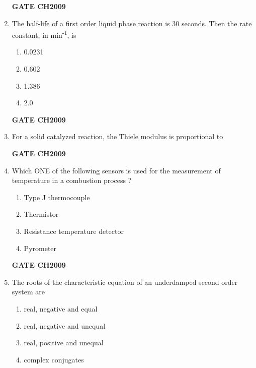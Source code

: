 \documentclass[journal,12pt,onecolumn]{IEEEtran}
\theoremstyle{remark}
\begin{document}
\begin{enumerate}
		\hfill
		\textbf{GATE CH2009} 
		
		\item The half-life of a first order liquid phase reaction is 30 seconds. Then the rate constant, in min\textsuperscript{-1}, is 
		\begin{enumerate}
			\item 0.0231
			\item 0.602
			\item 1.386
			\item2.0
		\end{enumerate} 
		
		\hfill
		\textbf{GATE CH2009} 
		
		\item For a solid catalyzed reaction, the Thiele modulus is proportional to 
		\begin{enumerate}
		\end{enumerate} 
		
		\hfill
		\textbf{GATE CH2009} 
		
		\item  Which ONE of the following sensors is used for the measurement of temperature in a combustion process \brak{T>1800\degree C} ?
		\begin{enumerate}
			\item  Type J thermocouple
			\item  Thermistor
			\item  Resistance temperature detector
			\item Pyrometer
		\end{enumerate} 
		
		\hfill
		\textbf{GATE CH2009} 
		
		\item The roots of the characteristic equation of an underdamped second order system are 
		\begin{enumerate}
			\item  real, negative and equal
			\item  real, negative and unequal
			\item  real, positive and unequal
			\item complex conjugates
		\end{enumerate} 
		

\end{enumerate}
\end{document}
